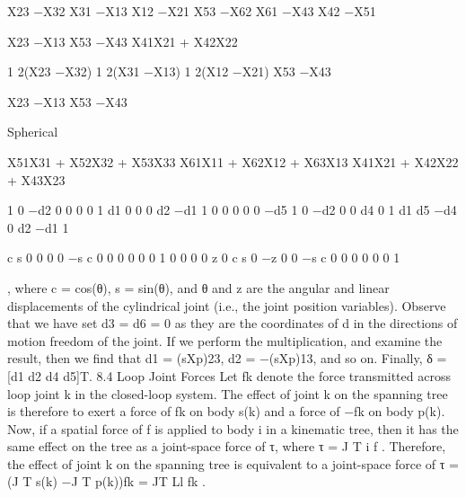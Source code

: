 X23 −X32 X31 −X13 X12 −X21 X53 −X62 X61 −X43 X42 −X51

X23 −X13 X53 −X43 X41X21 + X42X22

1 2(X23 −X32) 1 2(X31 −X13) 1 2(X12 −X21) X53 −X43

X23 −X13 X53 −X43

Spherical

X51X31 + X52X32 + X53X33 X61X11 + X62X12 + X63X13 X41X21 + X42X22 + X43X23

\begin{table}[ht]\centering
\caption{Formulae for δ = jcalc(type, X) approximate equation: sXp ≃}
\label{table:8.1}
\end{table}
1 0 −d2 0 0 0 0 1 d1 0 0 0 d2 −d1 1 0 0 0 0 0 −d5 1 0 −d2 0 0 d4 0 1 d1 d5 −d4 0 d2 −d1 1

c s 0 0 0 0 −s c 0 0 0 0 0 0 1 0 0 0 0 z 0 c s 0 −z 0 0 −s c 0 0 0 0 0 0 1

, where c = cos(θ), s = sin(θ), and θ and z are the angular and linear displacements of the cylindrical joint (i.e., the joint position variables). Observe that we have set d3 = d6 = 0 as they are the coordinates of d in the directions of motion freedom of the joint. If we perform the multiplication, and examine the result, then we find that d1 = (sXp)23, d2 = −(sXp)13, and so on. Finally, δ = [d1 d2 d4 d5]T. 8.4 Loop Joint Forces Let fk denote the force transmitted across loop joint k in the closed-loop system. The effect of joint k on the spanning tree is therefore to exert a force of fk on body s(k) and a force of −fk on body p(k). Now, if a spatial force of f is applied to body i in a kinematic tree, then it has the same effect on the tree as a joint-space force of τ, where τ = J T i f . Therefore, the effect of joint k on the spanning tree is equivalent to a joint-space force of τ = (J T s(k) −J T p(k))fk = JT Ll fk .

